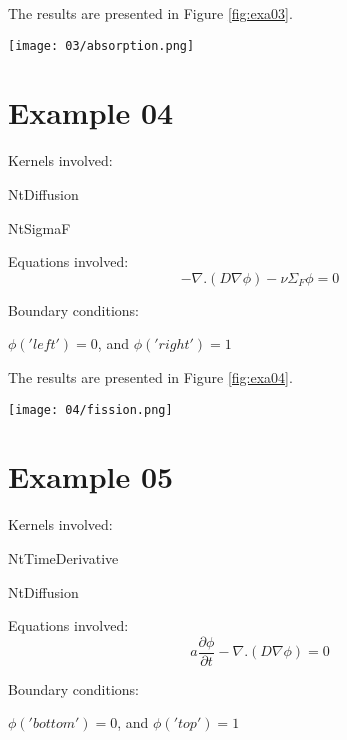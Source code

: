 \documentclass[11pt,letterpaper]{article}
\begin{document}
The results are presented in Figure \ref{fig:exa03}.
\begin{figure*}[!h]
	\centering
	\texttt{[image: 03/absorption.png]} 
	\hfill
	\caption{Flux.}
	\label{fig:exa03}
\end{figure*}

\newpage
\section{Example 04}

Kernels involved:
\begin{description}[font=$\bullet$\scshape\bfseries]
	\item[] NtDiffusion
	\item[] NtSigmaF
\end{description}

Equations involved:
\begin{equation}
-\nabla.(D\nabla \phi) - \nu\Sigma_{F}\phi =0
\end{equation}

Boundary conditions:
\begin{description}[]
	\item[] $\phi('left')=0$, and $\phi('right')=1$
\end{description}

The results are presented in Figure \ref{fig:exa04}.
\begin{figure*}[!h]
	\centering
	\texttt{[image: 04/fission.png]} 
	\hfill
	\caption{Flux.}
	\label{fig:exa04}
\end{figure*}

\newpage
\section{Example 05}

Kernels involved:
\begin{description}[font=$\bullet$\scshape\bfseries]
	\item[] NtTimeDerivative
	\item[] NtDiffusion
\end{description}

Equations involved:
\begin{equation}
a\frac{\partial\phi}{\partial t}-\nabla.(D\nabla \phi)=0
\end{equation}

Boundary conditions:
\begin{description}[]
	\item[] $\phi('bottom')=0$, and $\phi('top')=1$
\end{description}
\end{document}
